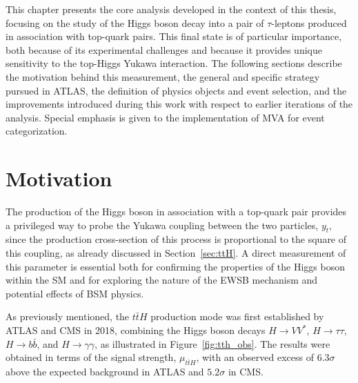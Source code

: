 \newcommand*{\pth}{$p^{H}_{\text{T}}$\xspace}
\newcommand*{\htautau}{$H \to \tau \tau$\xspace}
\newcommand*{\ztautau}{$Z \to \tau \tau$\xspace}
\newcommand*{\pt}{$p_{\text{T}}$\xspace}
\newcommand*{\taul}{$\tau$-lepton\xspace}
\newcommand*{\tauhadvis}{\ensuremath{\tauhad}\xspace}
\newcommand*{\mmc}{\ensuremath{m^\text{MMC}_{\tau\tau}}\xspace}
\newcommand*{\taulephad}{$\tau_{\text{lep}}\tau_{\text{had}}$\xspace}
\newcommand*{\tauhadhad}{$\tau_{\text{had}}\tau_{\text{had}}$\xspace}
\newcommand*{\tauemu}{$\tau_{e}\tau_{\mu}$\xspace}
\newcommand*{\mtt}{\ensuremath{m_{\tau\tau}}\xspace}


This chapter presents the core analysis developed in the context of this thesis, focusing on the study of the Higgs boson decay into a pair of $\tau$-leptons produced in association with top-quark pairs. This \ttHtt final state is of particular importance, both because of its experimental challenges and because it provides unique sensitivity to the top-Higgs Yukawa interaction. The following sections describe the motivation behind this measurement, the general and specific strategy pursued in ATLAS, the definition of physics objects and event selection, and the improvements introduced during this work with respect to earlier iterations of the analysis. Special emphasis is given to the implementation of MVA for event categorization.


\section{Motivation}
\label{sec:analysis_motivation}

The production of the Higgs boson in association with a top-quark pair provides a privileged way to probe the Yukawa coupling between the two particles, $y_{t}$, since the production cross-section of this process is proportional to the square of this coupling, as already discussed in Section~\ref{sec:ttH}. A direct measurement of this parameter is essential both for confirming the properties of the Higgs boson within the SM and for exploring the nature of the EWSB mechanism and potential effects of BSM physics.

As previously mentioned, the $t\bar{t}H$ production mode was first established by ATLAS and CMS in 2018, combining the Higgs boson decays $H \to VV^{*}$, $H \to \tau\tau$, $H \to b\bar{b}$, and $H \to \gamma\gamma$, as illustrated in Figure~\ref{fig:tth_obs}. The results were obtained in terms of the signal strength, $\mu_{t\bar{t}H}$, with an observed excess of $6.3\sigma$ above the expected background in ATLAS and $5.2\sigma$ in CMS.

